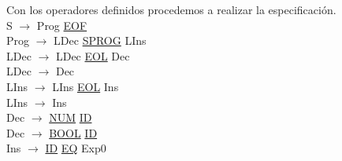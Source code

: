 \documentclass[\main/MemoriaPL.tex]{subfiles}
\begin{document}
    \par
    Con los operadores definidos procedemos a realizar la especificación.\\
    \vspace{2mm}
    S $\rightarrow$ Prog \underline{EOF}\\
    Prog $\rightarrow$ LDec \underline{SPROG} LIns\\
    LDec $\rightarrow$ LDec \underline{EOL} Dec\\
    LDec $\rightarrow$ Dec\\
    LIns $\rightarrow$ LIns \underline{EOL} Ins\\
    LIns $\rightarrow$ Ins\\
    Dec $\rightarrow$ \underline{NUM} \underline{ID}\\
    Dec $\rightarrow$ \underline{BOOL} \underline{ID}\\
    Ins $\rightarrow$ \underline{ID} \underline{EQ} Exp0\\
    \vspace{2mm}
\end{document}
